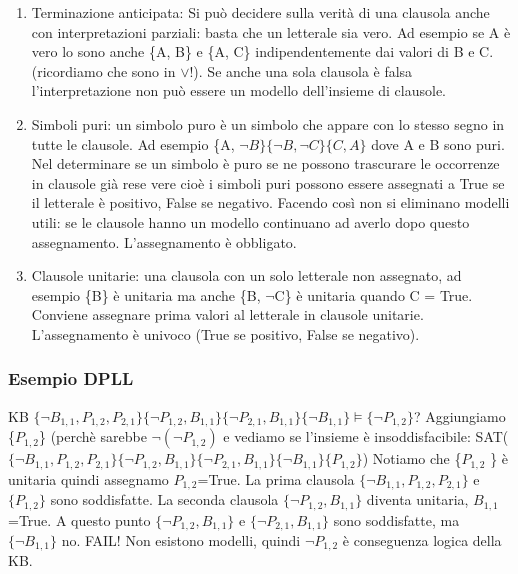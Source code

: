 \documentclass{article}
\begin{document}
\begin{enumerate}
    \item Terminazione anticipata: Si può decidere sulla verità di una clausola anche con interpretazioni parziali: basta che un letterale sia vero. Ad esempio se A è vero lo sono anche \{A, B\} e \{A, C\} indipendentemente dai valori di B e C. (ricordiamo che sono in $\lor$!). Se anche una sola clausola è falsa l'interpretazione non può essere un modello dell’insieme di clausole. 
    \item Simboli puri: un simbolo puro è un simbolo che appare con lo stesso segno in tutte le clausole. Ad esempio \{A, $\neg B\} \{ \neg B, \neg C\} \{C, A\}$ dove A e B sono puri. Nel determinare se un simbolo è puro se ne possono trascurare le occorrenze in clausole già rese vere cioè i simboli puri possono essere assegnati a True se il letterale è positivo, False se negativo. Facendo così non si eliminano modelli utili: se le clausole hanno un modello continuano ad averlo dopo questo assegnamento. L’assegnamento è obbligato.
    \item Clausole unitarie: una clausola con un solo letterale non assegnato, ad esempio \{B\} è unitaria ma anche \{B, $\neg$C\} è unitaria quando C = True. Conviene assegnare prima valori al letterale in clausole unitarie. L'assegnamento è univoco (True se positivo, False se negativo).
\end{enumerate}
\subsubsection{Esempio DPLL}
KB $\{\neg B_{1,1}, P_{1,2}, P_{2,1}\} \{\neg P_{1,2}, B_{1,1}\} \{\neg P_{2,1}, B_{1,1}\} \{\neg B_{1,1}\} \models \{\neg P_{1,2} \}$? \newline
Aggiungiamo \{$P_{1,2}$\} (perchè sarebbe $\neg (\neg P_{1,2})$ e vediamo se l’insieme è insoddisfacibile: \newline 
SAT($\{\neg B_{1,1}, P_{1,2}, P_{2,1}\} \{\neg P_{1,2}, B_{1,1}\} \{\neg P_{2,1}, B_{1,1}\} \{\neg B_{1,1}\} \{P_{1,2} \}$) \newline
Notiamo che \{$P_{1,2}$ \} è unitaria quindi assegnamo $P_{1,2}$=True. \newline
La prima clausola $\{\neg B_{1,1}, P_{1,2}, P_{2,1}\}$ e  $\{P_{1,2} \}$ sono soddisfatte. \newline
La seconda clausola $\{\neg P_{1,2}, B_{1,1}\}$ diventa unitaria, $B_{1,1}$=True. A questo punto $\{\neg P_{1,2}, B_{1,1}\}$ e $\{\neg P_{2,1}, B_{1,1}\}$ sono soddisfatte, ma $\{\neg B_{1,1}\}$ no. FAIL! \newline Non esistono modelli, quindi $\neg P_{1,2}$ è conseguenza logica della KB.
\end{document}
